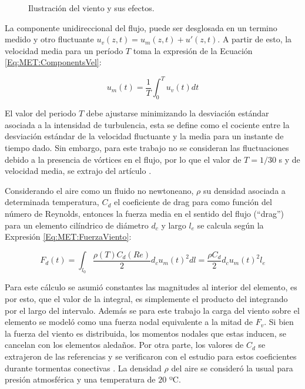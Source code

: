 \begingroup
\begin{figure}[htbp]
	\centering
	\label{fig:MET:Viento:EsqViento}
	\label{fig:MET:Viento:DragLift}
	\caption{Ilustración del viento y sus efectos.} 	\label{fig:Met:Viento:Esquemas}
\end{figure}
\endgroup

La componente unidireccional del flujo, puede ser desglosada en un termino medido y otro fluctuante $u_v(z,t)=u_m(z,t)+{u}'(z,t)$. A partir de esto, la velocidad media para un período $T$ toma la expresión de la Ecuación \eqref{Eq:MET:ComponentsVel}:


\begin{equation}\label{Eq:MET:ComponentsVel}
	u_m(t)=\frac{1}{T}\int_{0}^{T}u_v(t)dt
\end{equation}


El valor del periodo $T$ debe ajustarse minimizando la desviación estándar asociada a la intensidad de turbulencia, esta se define como el cociente entre la desviación estándar de la velocidad fluctuante y la media para un instante de tiempo dado. Sin embargo, para este trabajo no se consideran las fluctuaciones debido a la presencia de vórtices en el flujo, por lo que el valor de $T=1/30$ s y de velocidad media, se extrajo del artículo \citep{stengel2017measurements}.

Considerando el aire como un fluido no newtoneano, $\rho$ su densidad asociada a determinada temperatura, $C_d$ el coeficiente de drag para como función del número de Reynolds, entonces la fuerza media en el sentido del flujo (``drag'') para un elemento cilíndrico de diámetro $d_c$ y largo $l_e$ se calcula según la Expresión \eqref{Eq:MET:FuerzaViento}:


\begin{equation}
	\label{Eq:MET:FuerzaViento}
	F_d(t)=\int_{l_0}\frac{\rho (T)C_d(Re)}{2}{d_cu_m(t)^2} dl= \frac{\rho C_d}{2}d_cu_m(t)^2l_{e}
\end{equation}

Para este cálculo se asumió constantes las magnitudes al interior del elemento, es por esto, que el valor de la integral, es simplemente el producto del integrando por el largo del intervalo. Además se para este trabajo la carga del viento sobre el elemento se modeló como una fuerza nodal equivalente a la mitad de $F_v$. Si bien la fuerza del viento es distribuida, los momentos nodales que estas inducen, se cancelan con los elementos aledaños. Por otra parte, los valores de $C_d$ se extrajeron de las referencias \citep{Foti2016} y se verificaron con el estudio para estos coeficientes durante tormentas conectivas \citep{mara2007effects}. La densidad $\rho$ del aire se consideró la usual para presión atmosférica y una temperatura de $20$ ºC.

